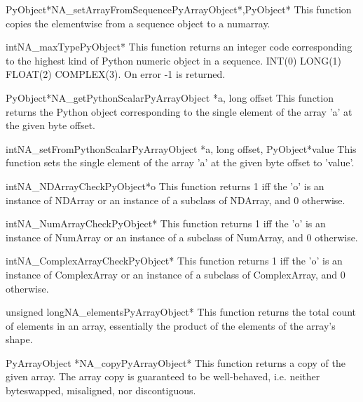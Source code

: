 \begin{cfuncdesc}{PyObject*}{NA_setArrayFromSequence}{PyArrayObject*,PyObject*}
This function copies the elementwise from a sequence object to a numarray.
\end{cfuncdesc}

\begin{cfuncdesc}{int}{NA_maxType}{PyObject*}
This function returns an integer code corresponding to the highest kind of
Python numeric object in a sequence.  INT(0) LONG(1) FLOAT(2) COMPLEX(3).
On error -1 is returned.
\end{cfuncdesc}

\begin{cfuncdesc}{PyObject*}{NA_getPythonScalar}{PyArrayObject *a, long offset}
This function returns the Python object corresponding to the single element of 
the array 'a' at the given byte offset.
\end{cfuncdesc}

\begin{cfuncdesc}{int}{NA_setFromPythonScalar}{PyArrayObject *a, long offset, PyObject*value}
This function sets the single element of the array 'a' at the given byte
offset to 'value'.
\end{cfuncdesc}

\begin{cfuncdesc}{int}{NA_NDArrayCheck}{PyObject*o}
This function returns 1 iff the 'o' is an instance of NDArray or an instance of
a subclass of NDArray, and 0 otherwise.
\end{cfuncdesc}

\begin{cfuncdesc}{int}{NA_NumArrayCheck}{PyObject*}
This function returns 1 iff the 'o' is an instance of NumArray or an instance of
a subclass of NumArray, and 0 otherwise.
\end{cfuncdesc}

\begin{cfuncdesc}{int}{NA_ComplexArrayCheck}{PyObject*}
This function returns 1 iff the 'o' is an instance of ComplexArray or an instance of
a subclass of ComplexArray, and 0 otherwise.
\end{cfuncdesc}

\begin{cfuncdesc}{unsigned long}{NA_elements}{PyArrayObject*}
This function returns the total count of elements in an array,  essentially the
product of the elements of the array's shape.
\end{cfuncdesc}

\begin{cfuncdesc}{PyArrayObject *}{NA_copy}{PyArrayObject*}
This function returns a copy of the given array.  The array copy is guaranteed
to be well-behaved, i.e. neither byteswapped, misaligned, nor discontiguous.
\end{cfuncdesc}

